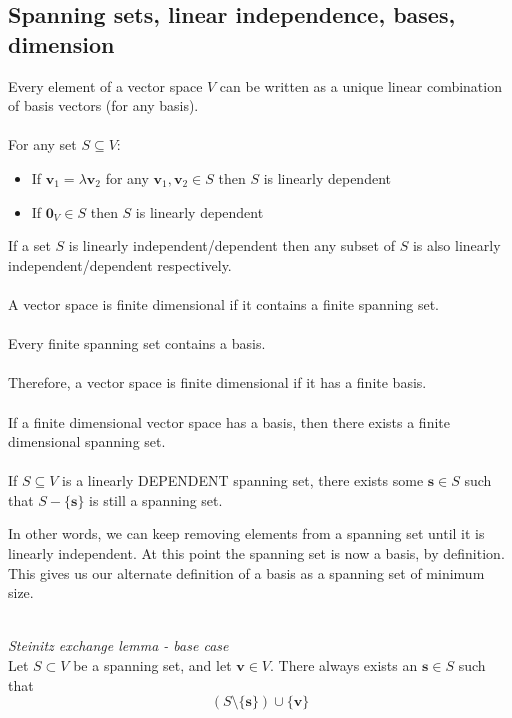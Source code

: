 \documentclass{article}
\renewcommand{\vec}[1]{\mathbf{#1}}
\begin{document}
\subsection{Spanning sets, linear independence, bases, dimension}
Every element of a vector space $ V $ can be written as a unique linear combination of basis vectors (for any basis).
\\\\
For any set $ S \subseteq V $:
\begin{itemize}
\item If $ \vec{v}_{1} = \lambda\vec{v}_{2} $ for any $ \vec{v}_{1}, \vec{v}_{2} \in S $ then $ S $ is linearly dependent
\item If $ \vec{0}_{V} \in S $ then $ S $ is linearly dependent
\end{itemize}
If a set $ S $ is linearly independent/dependent then any subset of $ S $ is also linearly independent/dependent respectively.
\\\\
A vector space is finite dimensional if it contains a finite spanning set.
\\\\
Every finite spanning set contains a basis.
\\\\
Therefore, a vector space is finite dimensional if it has a finite basis.
\\\\
If a finite dimensional vector space has a basis, then there exists a finite dimensional spanning set.
\\\\
If $ S \subseteq V $ is a linearly DEPENDENT spanning set, there exists some $ \vec{s} \in S $ such that $ S - \{\vec{s}\} $ is still a spanning set.
\begin{tcolorbox}[breakable]
In other words, we can keep removing elements from a spanning set until it is linearly independent. At this point the spanning set is now a basis, by definition. This gives us our alternate definition of a basis as a spanning set of minimum size.
\end{tcolorbox}
\noindent
\\
\textit{Steinitz exchange lemma - base case}
\\
Let $ S \subset V $ be a spanning set, and let $ \vec{v} \in V $. There always exists an $ \vec{s} \in S $ such that
\begin{equation}
(S \setminus \{\vec{s}\}) \cup \{\vec{v}\}
\end{equation}
\end{document}
